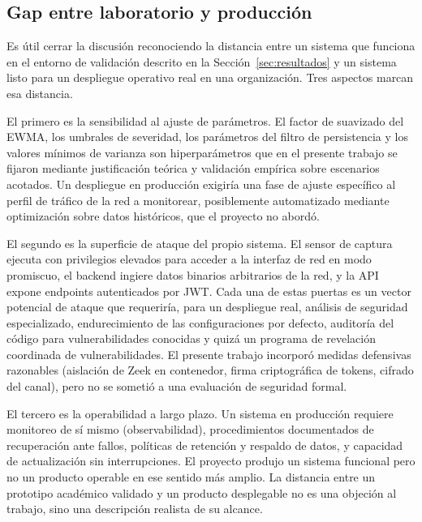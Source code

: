 \subsection{Gap entre laboratorio y producción}

Es útil cerrar la discusión reconociendo la distancia entre un 
sistema que funciona en el entorno de validación descrito en la 
Sección~\ref{sec:resultados} y un sistema listo para un despliegue 
operativo real en una organización. Tres aspectos marcan esa 
distancia.

El primero es la sensibilidad al ajuste de parámetros. El factor 
de suavizado del EWMA, los umbrales de severidad, los parámetros 
del filtro de persistencia y los valores mínimos de varianza son 
hiperparámetros que en el presente trabajo se fijaron mediante 
justificación teórica y validación empírica sobre escenarios 
acotados. Un despliegue en producción exigiría una fase de ajuste 
específico al perfil de tráfico de la red a monitorear, 
posiblemente automatizado mediante optimización sobre datos 
históricos, que el proyecto no abordó.

El segundo es la superficie de ataque del propio sistema. El 
sensor de captura ejecuta con privilegios elevados para acceder a 
la interfaz de red en modo promiscuo, el backend ingiere datos 
binarios arbitrarios de la red, y la API expone endpoints 
autenticados por JWT\@. Cada una de estas puertas es un vector 
potencial de ataque que requeriría, para un despliegue real, 
análisis de seguridad especializado, endurecimiento de las 
configuraciones por defecto, auditoría del código para 
vulnerabilidades conocidas y quizá un programa de revelación 
coordinada de vulnerabilidades. El presente trabajo incorporó 
medidas defensivas razonables (aislación de Zeek en contenedor, 
firma criptográfica de tokens, cifrado del canal), pero no se 
sometió a una evaluación de seguridad formal.

El tercero es la operabilidad a largo plazo. Un sistema en 
producción requiere monitoreo de sí mismo (observabilidad), 
procedimientos documentados de recuperación ante fallos, 
políticas de retención y respaldo de datos, y capacidad de 
actualización sin interrupciones. El proyecto produjo un sistema 
funcional pero no un producto operable en ese sentido más amplio. 
La distancia entre un prototipo académico validado y un producto 
desplegable no es una objeción al trabajo, sino una descripción 
realista de su alcance.